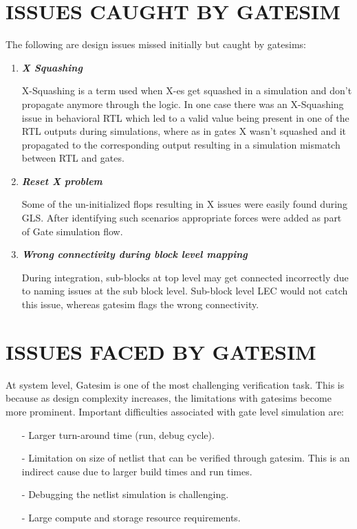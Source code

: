 \section{ISSUES CAUGHT BY GATESIM}
The following are design issues missed initially but caught by gatesims:
\begin{enumerate}
		
	\item \emph{\bf X Squashing}

	X-Squashing is a term used when X-es get squashed in a simulation and don't propagate anymore through the logic. In one case there was an X-Squashing issue in behavioral RTL which led to a valid value being present in one of the RTL outputs during simulations, where as in gates X wasn't squashed and it propagated to the corresponding output resulting in a simulation mismatch between RTL and gates.

	\item \emph{\bf Reset X problem}

	Some of the un-initialized flops resulting in X issues were easily found during GLS.  After identifying such scenarios appropriate forces were added as part of Gate simulation flow.

	\item \emph{\bf Wrong connectivity during block level mapping}

	During integration, sub-blocks at top level may get connected incorrectly due to naming issues at the sub block level. Sub-block level LEC would not catch this issue, whereas gatesim flags the wrong connectivity.
\end{enumerate}







\section{ISSUES FACED BY GATESIM}
At system level, Gatesim is one of the most challenging verification task. This is because as design complexity increases, the limitations with gatesims become more prominent. Important difficulties associated with gate level simulation are:
\begin{itemize}


\item[-] Larger turn-around time (run, debug cycle).
\item[-] Limitation on size of netlist that can be verified through gatesim. This is an indirect cause due to larger build times and run times.
\item[-] Debugging the netlist simulation is challenging.
\item[-] Large compute and storage resource requirements. 

\end{itemize}

